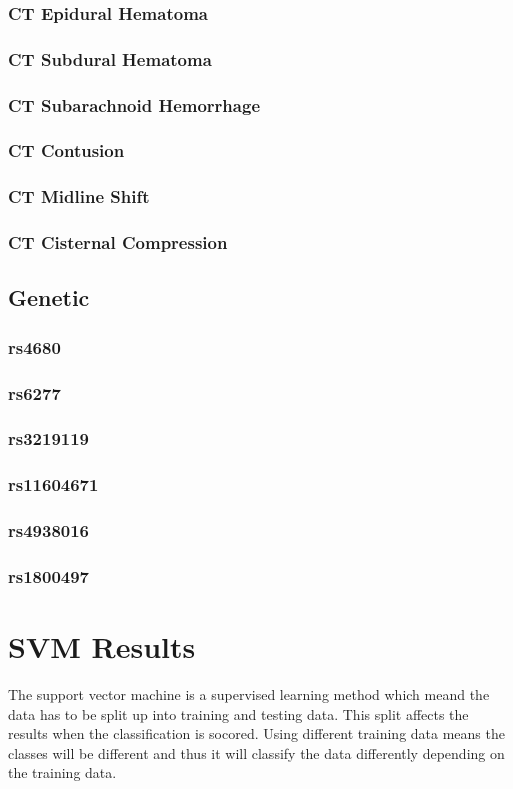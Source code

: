 \documentclass[11pt]{article}
\begin{document}
\subsubsection{CT Epidural Hematoma}
\subsubsection{CT Subdural Hematoma}
\subsubsection{CT Subarachnoid Hemorrhage}
\subsubsection{CT Contusion}
\subsubsection{CT Midline Shift}
\subsubsection{CT Cisternal Compression}
\subsection{Genetic}
\subsubsection{rs4680}
\subsubsection{rs6277}
\subsubsection{rs3219119}
\subsubsection{rs11604671}
\subsubsection{rs4938016}
\subsubsection{rs1800497}

\section{SVM Results}
The support vector machine is a supervised learning method which meand the data has to be split up into training and testing data. This split affects the results when the classification is socored. Using different training data means the classes will be different and thus it will classify the data differently depending on the training data.
\end{document}
